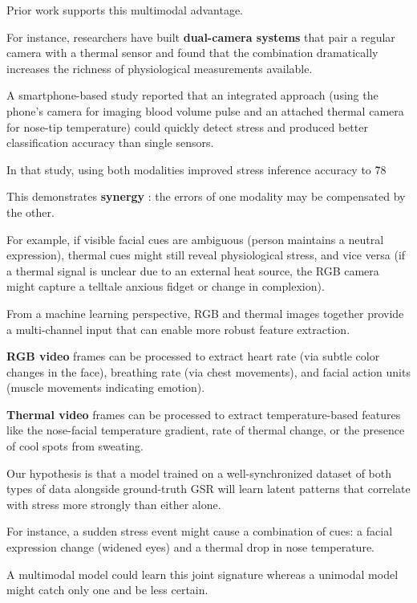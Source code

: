 Prior work supports this multimodal advantage.

For instance, researchers have built \textbf{dual-camera systems}
 that pair a regular camera with a thermal sensor and found that the combination dramatically increases the richness of physiological measurements available.

A smartphone-based study reported that an integrated approach (using the phone's camera for imaging blood volume pulse and an attached thermal camera for nose-tip temperature) could quickly detect stress and produced better classification accuracy than single sensors.

In that study, using both modalities improved stress inference accuracy to \~78%

This demonstrates \textbf{synergy}
: the errors of one modality may be compensated by the other.

For example, if visible facial cues are ambiguous (person maintains a neutral expression), thermal cues might still reveal physiological stress, and vice versa (if a thermal signal is unclear due to an external heat source, the RGB camera might capture a telltale anxious fidget or change in complexion).

From a machine learning perspective, RGB and thermal images together provide a multi-channel input that can enable more robust feature extraction.

\textbf{RGB video}
 frames can be processed to extract heart rate (via subtle color changes in the face), breathing rate (via chest movements), and facial action units (muscle movements indicating emotion).

\textbf{Thermal video}
 frames can be processed to extract temperature-based features like the nose-facial temperature gradient, rate of thermal change, or the presence of cool spots from sweating.

Our hypothesis is that a model trained on a well-synchronized dataset of both types of data alongside ground-truth GSR will learn latent patterns that correlate with stress more strongly than either alone.

For instance, a sudden stress event might cause a combination of cues: a facial expression change (widened eyes) and a thermal drop in nose temperature.

A multimodal model could learn this joint signature whereas a unimodal model might catch only one and be less certain.

